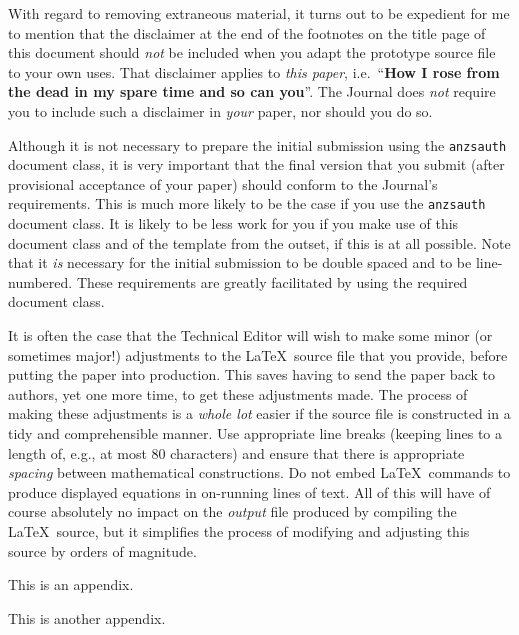\documentclass[
doublespace,
  times]{anzsauth}
\begin{document}
With regard to removing extraneous material, it turns out to be
expedient for me to mention that the disclaimer at the end of the
footnotes on the title page of this document should \emph{not} be
included when you adapt the prototype source file to your own uses. That
disclaimer applies to \emph{this paper}, i.e.~``\textbf{How I rose from
the dead in my spare time and so can you}''. The Journal does \emph{not}
require you to include such a disclaimer in \emph{your} paper, nor
should you do so.

Although it is not necessary to prepare the initial submission using the
\texttt{anzsauth} document class, it is very important that the final
version that you submit (after provisional acceptance of your paper)
should conform to the Journal's requirements. This is much more likely
to be the case if you use the \texttt{anzsauth} document class. It is
likely to be less work for you if you make use of this document class
and of the template from the outset, if this is at all possible. Note
that it \emph{is} necessary for the initial submission to be double
spaced and to be line-numbered. These requirements are greatly
facilitated by using the required document class.

It is often the case that the Technical Editor will wish to make some
minor (or sometimes major!) adjustments to the \LaTeX~source file that
you provide, before putting the paper into production. This saves having
to send the paper back to authors, yet one more time, to get these
adjustments made. The process of making these adjustments is a
\emph{whole lot} easier if the source file is constructed in a tidy and
comprehensible manner. Use appropriate line breaks (keeping lines to a
length of, e.g., at most 80 characters) and ensure that there is
appropriate \emph{spacing} between mathematical constructions. Do not
embed \LaTeX~commands to produce displayed equations in on-running lines
of text. All of this will have of course absolutely no impact on the
\emph{output} file produced by compiling the \LaTeX~source, but it
simplifies the process of modifying and adjusting this source by orders
of magnitude.

\begin{Appendix}
\label{app:mung}

This is an appendix. \lipsum[1]

\end{Appendix}

\begin{Appendix}
\label{app:gorp}

This is another appendix. \lipsum[2]

\end{Appendix}
\end{document}
